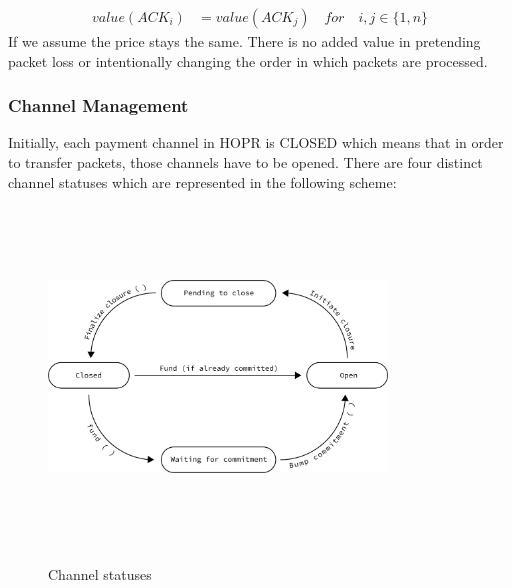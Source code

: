 \begin{align}
 value ( ACK_i )  &  =value ( ACK_j ) \quad for \quad i,j\in \{1,n\}
\end{align}
If we assume the price stays the same. There is no added value in pretending packet loss or intentionally changing the order in which packets are processed.

\subsubsection{Channel Management}
Initially, each payment channel in HOPR is CLOSED which means that in order to transfer packets, those channels have to be opened. There are four distinct channel statuses which are represented in the following scheme:

\begin{figure}[H]
    \centering
    \includegraphics[width=9cm,height=9cm,keepaspectratio]{../yellowpaper/images/states2.png}
\label{fig:channel statuses}
    \caption{Channel statuses}
\end{figure}

